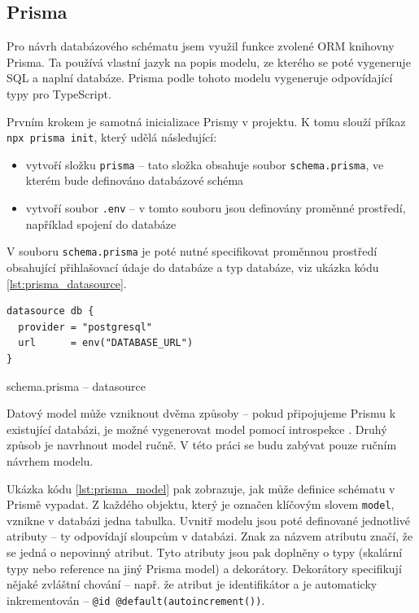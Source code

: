 \documentclass[thesis=M,czech]{FITthesis}[2019/12/23]
\begin{document}
\subsection{Prisma}
Pro návrh databázového schématu jsem využil funkce zvolené ORM knihovny Prisma. Ta používá vlastní jazyk na popis modelu, ze kterého se poté vygeneruje SQL a naplní databáze. Prisma podle tohoto modelu vygeneruje odpovídající typy pro TypeScript.

Prvním krokem je samotná inicializace Prismy v projektu. K tomu slouží příkaz \texttt{npx prisma init}, který udělá následující:
\begin{itemize}
  \item vytvoří složku \texttt{prisma} -- tato složka obsahuje soubor \texttt{schema.prisma}, ve kterém bude definováno databázové schéma
  \item vytvoří soubor \texttt{.env} -- v tomto souboru jsou definovány proměnné prostředí, například spojení do databáze
\end{itemize}

V souboru \texttt{schema.prisma} je poté nutné specifikovat proměnnou prostředí obsahující přihlašovací údaje do databáze a typ databáze, viz ukázka kódu \ref{lst:prisma_datasource}.

\begin{listing}[H]
\begin{verbatim}
datasource db {
  provider = "postgresql"
  url      = env("DATABASE_URL")
}
\end{verbatim}
\caption{schema.prisma -- datasource}
\label{lst:prisma_datasource}
\end{listing}

Datový model může vzniknout dvěma způsoby -- pokud připojujeme Prismu k existující databázi, je možné vygenerovat model pomocí introspekce \cite{prisma_introspection}. Druhý způsob je navrhnout model ručně. V této práci se budu zabývat pouze ručním návrhem modelu.

Ukázka kódu \ref{lst:prisma_model} pak zobrazuje, jak může definice schématu v Prismě vypadat. Z každého objektu, který je označen klíčovým slovem \texttt{model}, vznikne v databázi jedna tabulka. Uvnitř modelu jsou poté definované jednotlivé atributy -- ty odpovídají sloupcům v databázi. Znak za názvem atributu značí, že se jedná o nepovinný atribut. Tyto atributy jsou pak doplněny o typy (skalární typy nebo reference na jiný Prisma model) a dekorátory. Dekorátory specifikují nějaké zvláštní chování -- např. že atribut je identifikátor a je automaticky inkrementován -- \texttt{@id @default(autoincrement())}.
\end{document}
